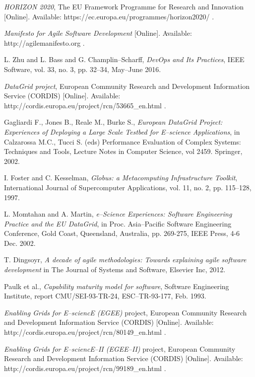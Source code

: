 \documentclass[journal]{IEEEtran}
\begin{document}
\begin{thebibliography}{1}

\emph{HORIZON 2020}, The EU Framework Programme for Research and Innovation [Online]. Available: https://ec.europa.eu/programmes/horizon2020/ .

\emph{Manifesto for Agile Software Development} [Online]. Available: http://agilemanifesto.org .

L. Zhu and L. Bass and G. Champlin--Scharff, \emph{DevOps and Its Practices},
IEEE Software, vol. 33, no. 3, pp. 32--34, May--June 2016.

\emph{DataGrid project}, European Community Research and Development
Information Service (CORDIS) [Online]. Available: http://cordis.europa.eu/project/rcn/53665\_en.html .

Gagliardi F., Jones B., Reale M., Burke S., \emph{European DataGrid Project: Experiences of Deploying a Large Scale Testbed for E--science Applications},
in Calzarossa M.C., Tucci S. (eds) Performance Evaluation of Complex Systems: Techniques and Tools, Lecture Notes in Computer Science, vol 2459. Springer, 2002.

I. Foster and C. Kesselman, \emph{Globus: a Metacomputing Infrastructure
Toolkit}, International Journal of Supercomputer Applications, vol. 11, no. 2,
pp. 115--128, 1997.

L. Momtahan and A. Martin, \emph{e--Science Experiences: Software Engineering
Practice and the EU DataGrid}, in Proc. Asia--Pacific Software Engineering
Conference, Gold Coast, Queensland, Australia, pp. 269-275, IEEE Press,
4-6 Dec. 2002.

T. Dingsoyr, \emph{A decade of agile methodologies: Towards explaining agile
software development} in The Journal of Systems and Software, Elsevier Inc,
2012.

Paulk et al., \emph{Capability maturity model for software}, Software
Engineering Institute, report CMU/SEI-93-TR-24, ESC--TR-93-177, Feb. 1993.

\emph{Enabling Grids for E--sciencE (EGEE)} project, European Community
Research and Development Information Service (CORDIS) [Online]. Available:
http://cordis.europa.eu/project/rcn/80149\_en.html .

\emph{Enabling Grids for E--sciencE--II (EGEE--II)} project, European Community
Research and Development Information Service (CORDIS) [Online]. Available:
http://cordis.europa.eu/project/rcn/99189\_en.html .


\end{thebibliography}
\end{document}
